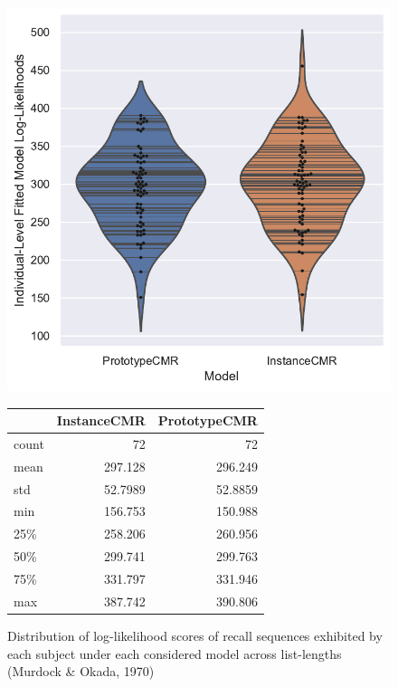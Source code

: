 \documentclass[
  letterpaper,
]{article}
\begin{document}
\begin{figure}

\begin{minipage}[c]{\linewidth}

{\centering 

\includegraphics{./figures/individual_murdock1970.pdf}

}

\end{minipage}%
\newline
\begin{minipage}[c]{\linewidth}

{\centering 

\begin{longtable}[]{@{}lrr@{}}
\toprule()
& InstanceCMR & PrototypeCMR \\
\midrule()
\endhead
count & 72 & 72 \\
mean & 297.128 & 296.249 \\
std & 52.7989 & 52.8859 \\
min & 156.753 & 150.988 \\
25\% & 258.206 & 260.956 \\
50\% & 299.741 & 299.763 \\
75\% & 331.797 & 331.946 \\
max & 387.742 & 390.806 \\
\bottomrule()
\end{longtable}

}

\end{minipage}%

\caption{\label{fig-murdokafits}Distribution of log-likelihood scores of
recall sequences exhibited by each subject under each considered model
across list-lengths (Murdock \& Okada, 1970)}

\end{figure}
\end{document}
